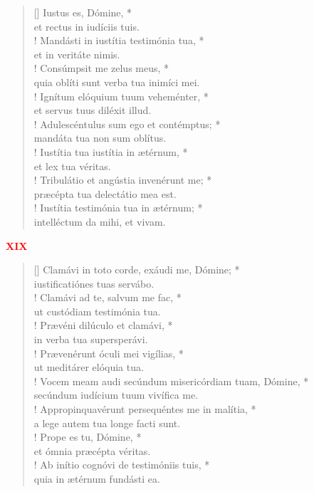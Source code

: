 \begin{verse}[\versewidth]
Iustus es, Dómine, *\\
et rectus in iudíciis tuis.\\!
\vin Mandásti in iustítia testimónia tua, *\\
\vin et in veritáte nimis.\\!
Consúmpsit me zelus meus, *\\
quia oblíti sunt verba tua inimíci mei.\\!
\vin Ignítum elóquium tuum veheménter, *\\
\vin et servus tuus diléxit illud.\\!
Adulescéntulus sum ego et contémptus; *\\
mandáta tua non sum oblítus.\\!
\vin Iustítia tua iustítia in ætérnum, *\\
\vin et lex tua véritas.\\!
Tribulátio et angústia invenérunt me; *\\
præcépta tua delectátio mea est.\\!
\vin Iustítia testimónia tua in ætérnum; *\\
\vin intelléctum da mihi, et vivam.\\
\end{verse}
\begin{center}
\textcolor{red}{\bf XIX}\\
\end{center}
\begin{verse}[\versewidth]
Clamávi in toto corde, exáudi me, Dómine; *\\
iustificatiónes tuas servábo.\\!
\vin Clamávi ad te, salvum me fac, *\\
\vin ut custódiam testimónia tua.\\!
Prævéni dilúculo et clamávi, *\\
in verba tua supersperávi.\\!
\vin Prævenérunt óculi mei vigílias, *\\
\vin ut meditárer elóquia tua.\\!
Vocem meam audi secúndum misericórdiam tuam, Dómine, *\\
secúndum iudícium tuum vivífica me.\\!
\vin Appropinquavérunt persequéntes me in malítia, *\\
\vin a lege autem tua longe facti sunt.\\!
Prope es tu, Dómine, *\\
et ómnia præcépta véritas.\\!
\vin Ab inítio cognóvi de testimóniis tuis, *\\
\vin quia in ætérnum fundásti ea.\\
\end{verse}
\vspace{1cm}


